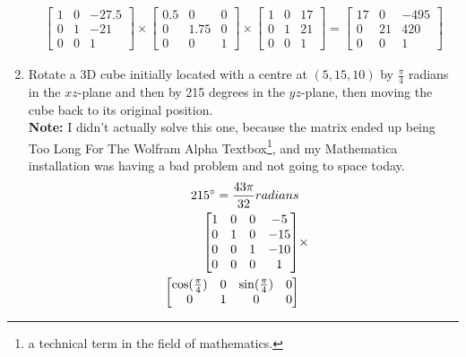 \documentclass[a4paper,12pt]{article}
\begin{document}
\begin{enumerate}
\begin{gather*}
        \begin{bmatrix}
            1 & 0 & -27.5 \\
            0 & 1 & -21   \\
            0 & 0 & 1
        \end{bmatrix}
        \times
        \begin{bmatrix}
            0.5 & 0    & 0 \\
            0   & 1.75 & 0 \\
            0   & 0    & 1
        \end{bmatrix}
        \times
        \begin{bmatrix}
            1 & 0 & 17 \\
            0 & 1 & 21 \\
            0 & 0 & 1
        \end{bmatrix}
        = \begin{bmatrix}
            17 & 0  & -495 \\
            0  & 21 & 420 \\ %
            0  & 0  & 1
        \end{bmatrix}
    \end{gather*}
    \item Rotate a 3D cube initially located with a centre at $(5, 15, 10)$ by $\frac{\pi}{4}$ radians in the $xz$-plane and then by 215 degrees in the $yz$-plane, then moving the cube back to its original position.\\
    \textbf{Note:} I didn't actually solve this one, because the matrix ended up being Too Long For The Wolfram Alpha Textbox\footnote{a technical term in the field of mathematics.}, and my Mathematica installation was having a bad problem and not going to space today.
    \begin{align*}
        215\degree = \frac{43 \pi}{32} radians \\
        \begin{bmatrix}
            1 & 0 & 0 & -5  \\
            0 & 1 & 0 & -15 \\
            0 & 0 & 1 & -10 \\
            0 & 0 & 0 & 1
        \end{bmatrix}
        &\times \\
        \begin{bmatrix}
            \cos(\frac{\pi}{4})  & 0 & \sin(\frac{\pi}{4}) & 0 \\
            0                    & 1 & 0                   & 0 \\

\end{bmatrix}
\end{align*}
\end{enumerate}
\end{document}
